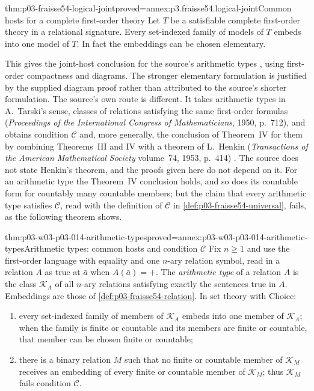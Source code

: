 \begin{hbtheorem}{thm:p03-fraisse54-logical-joint}{proved=annex:p3.fraisse54.logical-joint}{Common hosts for a complete first-order theory}
Let \(T\) be a satisfiable complete first-order theory in a relational
signature. Every set-indexed family of models of \(T\) embeds into one
model of \(T\). In fact the embeddings can be chosen elementary.
\end{hbtheorem}

This gives the joint-host conclusion for the source's arithmetic types
\cite[\S10.1]{Fraisse1954}, using first-order compactness and diagrams.
The stronger elementary formulation is justified by the supplied diagram
proof rather than attributed to the source's shorter formulation.
The source's own route is different. It takes arithmetic types in
A.~Tarski's sense, classes of relations satisfying the same first-order
formulas (\emph{Proceedings of the International Congress of
Mathematicians}, 1950, p.~712), and obtains condition \(\mathcal C\) and,
more generally, the conclusion of Theorem~IV for them by combining
Theorems~III and IV with a theorem of L.~Henkin (\emph{Transactions of the
American Mathematical Society} volume~74, 1953, p.~414)
\cite[\S10.1 and nn.~9--10, p.~388]{Fraisse1954}. The source does not
state Henkin's theorem, and the proofs given here do not depend on it.
For an arithmetic type the Theorem~IV conclusion holds, and so does its
countable form for countably many countable members; but the claim that
every arithmetic type satisfies \(\mathcal C\), read with the definition
of \(\mathcal C\) in \cref{def:p03-fraisse54-universal}, fails, as the
following theorem shows.

\begin{hbtheorem}{thm:p03-w03-p03-014-arithmetic-types}{proved=annex:p03-w03-p03-014-arithmetic-types}{Arithmetic types: common hosts and condition \(\mathcal C\)}
Fix \(n\geq1\) and use the first-order language with equality and one
\(n\)-ary relation symbol, read in a relation \(A\) as true at
\(\bar a\) when \(A(\bar a)=+\). The \emph{arithmetic type} of a relation
\(A\) is the class \(\mathcal K_A\) of all \(n\)-ary relations satisfying
exactly the sentences true in \(A\). Embeddings are those of
\cref{def:p03-fraisse54-relation}. In set theory with Choice:
\begin{enumerate}
\item every set-indexed family of members of \(\mathcal K_A\) embeds into
      one member of \(\mathcal K_A\); when the family is finite or countable
      and its members are finite or countable, that member can be chosen
      finite or countable;
\item there is a binary relation \(M\) such that no finite or countable
      member of \(\mathcal K_M\) receives an embedding of every finite or
      countable member of \(\mathcal K_M\); thus \(\mathcal K_M\) fails
      condition \(\mathcal C\).
\end{enumerate}
\end{hbtheorem}

